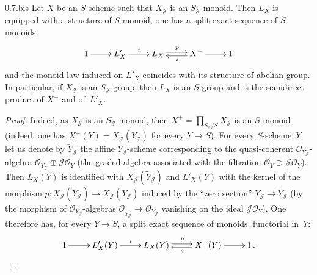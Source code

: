 \begin{corollary}{0.7.bis}
\label{III.0.7.bis}
Let \(X\) be an \(S\)-scheme such that \(X_{\mathcal{J}}\) is an
\(S_{\mathcal{J}}\)-monoid. Then \(L_{X}\) is equipped with a structure of
\(S\)-monoid, one has a split exact sequence of \(S\)-monoids:
\[
\xymatrix{
1 \ar[r]
  & L'_{X} \ar[r]^{i}
  & L_{X} \ar@<0.5ex>[r]^{p}
  & X^{+} \ar@<0.5ex>[l]^{s} \ar[r]
  & 1
}
\]
and the monoid law induced on \(L'_{X}\) coincides with its structure of
abelian group.
In particular, if \(X_{\mathcal{J}}\) is an \(S_{\mathcal{J}}\)-group, then
\(L_{X}\) is an \(S\)-group and is the semidirect product of \(X^{+}\) and
of~\(L'_{X}\).
\end{corollary}

\begin{proof}
Indeed, as \(X_{\mathcal{J}}\) is an \(S_{\mathcal{J}}\)-monoid, then
\(X^{+}=\prod_{S_{\mathcal{J}}/S}X_{\mathcal{J}}\) is an \(S\)-monoid (indeed,
one has \(X^{+}(Y)=X_{\mathcal{J}}(Y_{\mathcal{J}})\) for every \(Y\to S\)).
For every \(S\)-scheme~\(Y\), let us denote by \(\widetilde{Y}_{\mathcal{J}}\)
the affine \(Y_{\mathcal{J}}\)-scheme corresponding to the quasi-coherent
\(\mathcal{O}_{Y_{\mathcal{J}}}\)-algebra
\(\mathcal{O}_{Y_{\mathcal{J}}}\oplus\mathcal{J}\mathcal{O}_{Y}\)
(\ie the graded algebra associated with the filtration
\(\mathcal{O}_{Y}\supset\mathcal{J}\mathcal{O}_{Y}\)). Then \(L_{X}(Y)\) is
identified with \(X_{\mathcal{J}}(\widetilde{Y}_{\mathcal{J}})\) and
\(L'_{X}(Y)\) with the kernel of the morphism
\(p\colon X_{\mathcal{J}}(\widetilde{Y}_{\mathcal{J}})
\to X_{\mathcal{J}}(Y_{\mathcal{J}})\) induced by the ``zero section''
\(Y_{\mathcal{J}}\to\widetilde{Y}_{\mathcal{J}}\)
(\ie by the morphism of \(\mathcal{O}_{Y_{\mathcal{J}}}\)-algebras
\(\mathcal{O}_{\widetilde{Y}_{\mathcal{J}}}\to\mathcal{O}_{Y_{\mathcal{J}}}\)
vanishing on the ideal \(\mathcal{J}\mathcal{O}_{Y}\)). One therefore has,
for every \(Y\to S\), a split exact sequence of monoids, functorial in~\(Y\):
\[
\xymatrix{
1 \ar[r]
  & L'_{X}(Y) \ar[r]^{i}
  & L_{X}(Y) \ar@<0.5ex>[r]^{p}
  & X^{+}(Y) \ar@<0.5ex>[l]^{s} \ar[r]
  & 1\,.
}
\]


\end{proof}
